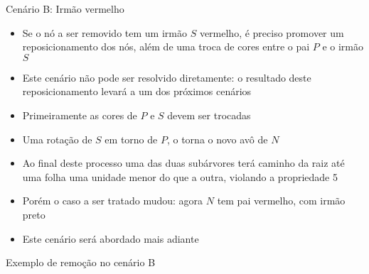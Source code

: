 \begin{frame}[fragile]{Cenário B: Irmão vermelho}

    \begin{itemize}
        \item Se o nó a ser removido tem um irmão $S$ vermelho, é preciso promover um 
            reposicionamento dos nós, além de uma troca de cores entre o pai $P$ e o irmão $S$

        \item Este cenário não pode ser resolvido diretamente: o resultado deste reposicionamento
            levará a um dos próximos cenários

        \item Primeiramente as cores de $P$ e $S$ devem ser trocadas

        \item Uma rotação de $S$ em torno de $P$, o torna o novo avô de $N$

        \item Ao final deste processo uma das duas subárvores terá caminho da raiz até uma folha
            uma unidade menor do que a outra, violando a propriedade 5

        \item Porém o caso a ser tratado mudou: agora $N$ tem pai vermelho, com irmão preto

        \item Este cenário será abordado mais adiante
    \end{itemize}

\end{frame}

\begin{frame}[fragile]{Exemplo de remoção no cenário B}


\end{frame}

